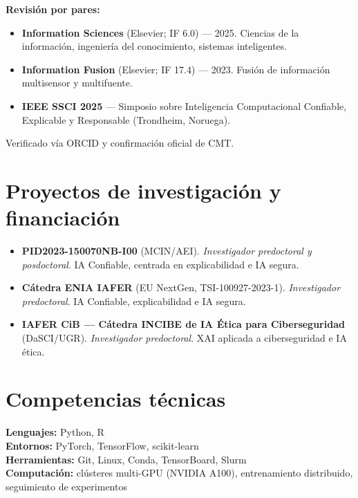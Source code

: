 \documentclass[10pt,a4paper]{article}
\newcommand{\blueitem}[1]{\textcolor{subtitleblue}{\textbf{#1}}}
\begin{document}
\blueitem{Revisión por pares:}
\begin{sloppypar}
\begin{itemize}
    \item \textbf{Information Sciences} (Elsevier; IF 6.0) --- 2025. Ciencias de la información, ingeniería del conocimiento, sistemas inteligentes.
    \item \textbf{Information Fusion} (Elsevier; IF 17.4) --- 2023. Fusión de información multisensor y multifuente.
    \item \textbf{IEEE SSCI 2025} --- Simposio sobre Inteligencia Computacional Confiable, Explicable y Responsable (Trondheim, Noruega).
\end{itemize}
\end{sloppypar}
Verificado vía ORCID y confirmación oficial de CMT.

\section*{Proyectos de investigación y financiación}

\begin{itemize}
    \item \textbf{PID2023-150070NB-I00} (MCIN/AEI). \emph{Investigador predoctoral y posdoctoral}. IA Confiable, centrada en explicabilidad e IA segura.
    \item \textbf{Cátedra ENIA IAFER} (EU NextGen, TSI-100927-2023-1). \emph{Investigador predoctoral}. IA Confiable, explicabilidad e IA segura.
    \item \textbf{IAFER CiB --- Cátedra INCIBE de IA Ética para Ciberseguridad} (DaSCI/UGR). \emph{Investigador predoctoral}. XAI aplicada a ciberseguridad e IA ética.
\end{itemize}

\section*{Competencias técnicas}

\blueitem{Lenguajes:} Python, R \\
\blueitem{Entornos:} PyTorch, TensorFlow, scikit-learn \\
\blueitem{Herramientas:} Git, Linux, Conda, TensorBoard, Slurm \\
\blueitem{Computación:} clústeres multi-GPU (NVIDIA A100), entrenamiento distribuido, seguimiento de experimentos

\end{document}
